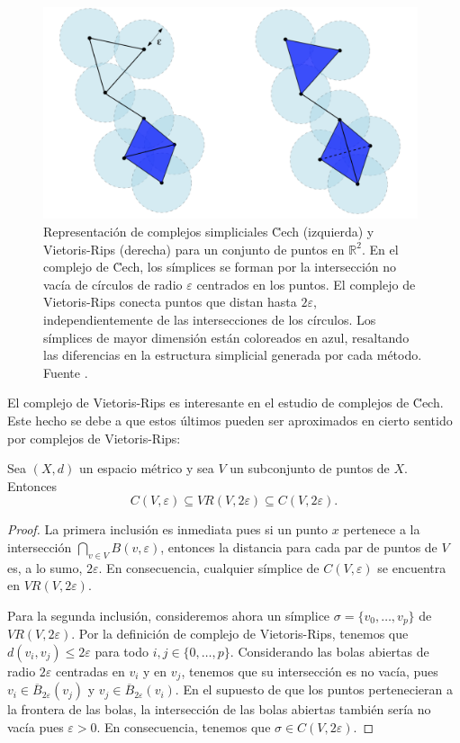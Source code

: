 \begin{figure}
	\centering
	\includegraphics[width=110mm]{img/cech-vr.png}
	\caption{Representación de complejos simpliciales \u Cech (izquierda) y
		Vietoris-Rips (derecha) para un conjunto de puntos en $\mathbb{R}^{2}$. En el complejo
		de \u Cech, los símplices se forman por la intersección no vacía de círculos
		de radio $\varepsilon$ centrados en los puntos. El complejo de Vietoris-Rips conecta
		puntos que distan hasta $2\varepsilon$, independientemente de las
		intersecciones de los círculos. Los símplices de mayor dimensión están coloreados
		en azul, resaltando las diferencias en la estructura simplicial generada por
		cada método. Fuente \cite{chazal2021introduction}.}
\end{figure}

El complejo de Vietoris-Rips es interesante en el estudio de complejos de \u Cech.
Este hecho se debe a que estos últimos pueden ser aproximados en cierto sentido
por complejos de Vietoris-Rips:

\begin{proposicion}
	Sea $(X,d)$ un espacio métrico y sea $V$ un subconjunto de puntos de $X$.
	Entonces
	\[
	C(V, \varepsilon) \subseteq VR(V, 2\varepsilon) \subseteq C(V, 2\varepsilon).
	\]
\end{proposicion}
\begin{proof}
	La primera inclusión es inmediata pues si un punto $x$ pertenece a la intersección
	$\bigcap_{v \in V}B(v, \varepsilon)$, entonces la distancia para cada par de
	puntos de $V$ es, a lo sumo, $2 \varepsilon$. En consecuencia, cualquier
	símplice de $C(V,\varepsilon)$ se encuentra en $VR(V, 2\varepsilon)$.
	
	Para la segunda inclusión, consideremos ahora un símplice $\sigma = \{v_{0}, \dots
	, v_{p}\}$ de $VR(V, 2\varepsilon)$. Por la definición de complejo de Vietoris-Rips,
	tenemos que $d(v_{i}, v_{j}) \leq 2\varepsilon$ para todo $i,j \in \{0, \dots,
	p\}$. Considerando las bolas abiertas de radio $2\varepsilon$ centradas en
	$v_{i}$ y en $v_{j}$, tenemos que su intersección es no vacía, pues
	$v_{i} \in \overline{B}_{2\varepsilon}(v_{j})$ y
	$v_{j} \in \overline{B}_{2\varepsilon}(v_{i})$. En el supuesto de que los puntos
	pertenecieran a la frontera de las bolas, la intersección de las bolas
	abiertas también sería no vacía pues $\varepsilon > 0$. En consecuencia,
	tenemos que $\sigma \in C(V,2\varepsilon)$.
\end{proof}

